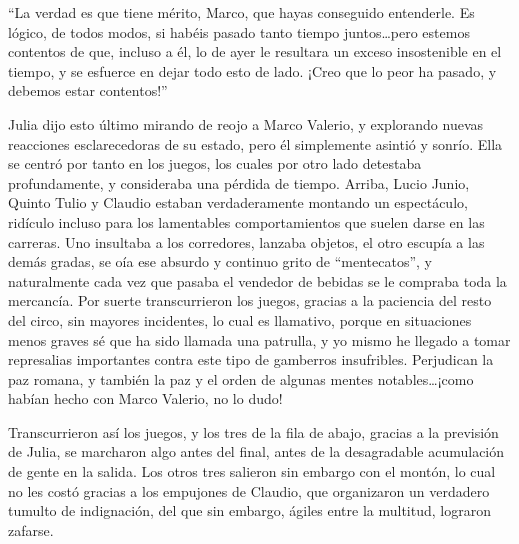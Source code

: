 \documentclass[11pt,openany]{book}
\begin{document}
“La verdad es que tiene mérito, Marco, que hayas conseguido entenderle. Es lógico, de todos modos, si habéis pasado tanto tiempo juntos\dots pero estemos contentos de que, incluso a él, lo de ayer le resultara un exceso insostenible en el tiempo, y se esfuerce en dejar todo esto de lado. ¡Creo que lo peor ha pasado, y debemos estar contentos!” 

Julia dijo esto último mirando de reojo a Marco Valerio, y explorando nuevas reacciones esclarecedoras de su estado, pero él simplemente asintió y sonrío. Ella se centró por tanto en los juegos, los cuales por otro lado detestaba profundamente, y consideraba una pérdida de tiempo. Arriba, Lucio Junio, Quinto Tulio y Claudio estaban verdaderamente montando un espectáculo, ridículo incluso para los lamentables comportamientos que suelen darse en las carreras. Uno insultaba a los corredores, lanzaba objetos, el otro escupía a las demás gradas, se oía ese absurdo y continuo grito de “mentecatos”, y naturalmente cada vez que pasaba el vendedor de bebidas se le compraba toda la mercancía. Por suerte transcurrieron los juegos, gracias a la paciencia del resto del circo, sin mayores incidentes, lo cual es llamativo, porque en situaciones menos graves sé que ha sido llamada una patrulla, y yo mismo he llegado a tomar represalias importantes contra este tipo de gamberros insufribles. Perjudican la paz romana, y también la paz y el orden de algunas mentes notables\dots ¡como habían hecho con Marco Valerio, no lo dudo! 

Transcurrieron así los juegos, y los tres de la fila de abajo, gracias a la previsión de Julia, se marcharon algo antes del final, antes de la desagradable acumulación de gente en la salida. Los otros tres salieron sin embargo con el montón, lo cual no les costó gracias a los empujones de Claudio, que organizaron un verdadero tumulto de indignación, del que sin embargo, ágiles entre la multitud, lograron zafarse. 
\end{document}
